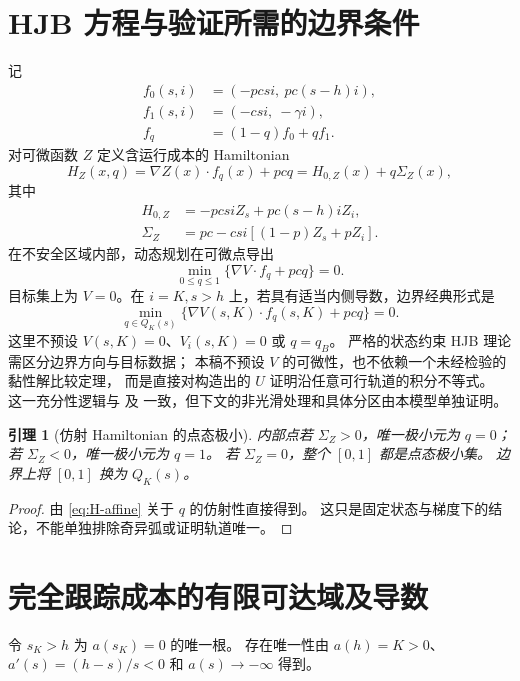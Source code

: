 \documentclass[11pt,a4paper,UTF8]{ctexart}
\newtheorem{lemma}[theorem]{引理}
\theoremstyle{definition}
\begin{document}
\section{HJB 方程与验证所需的边界条件}
\label{sec:HJB}
记
\begin{align}
f_0(s,i)&=(-pcsi,\ pc(s-h)i),\label{eq:f0}\\
f_1(s,i)&=(-csi,\ -\gamma i),\label{eq:f1}\\
f_q&=(1-q)f_0+qf_1.\label{eq:control-affine}
\end{align}
对可微函数 $Z$ 定义含运行成本的 Hamiltonian
\begin{equation}
H_Z(x,q)=\nabla Z(x)\cdot f_q(x)+pcq
=H_{0,Z}(x)+q\Sigma_Z(x),
\label{eq:H-affine}
\end{equation}
其中
\begin{align}
H_{0,Z}&=-pcsiZ_s+pc(s-h)iZ_i,\label{eq:H0}\\
\Sigma_Z&=pc-csi[(1-p)Z_s+pZ_i].\label{eq:switching-function}
\end{align}
在不安全区域内部，动态规划在可微点导出
\begin{equation}
\min_{0\le q\le1}\{\nabla V\cdot f_q+pcq\}=0.
\label{eq:HJB}
\end{equation}
目标集上为 $V=0$。在 $i=K,s>h$ 上，若具有适当内侧导数，边界经典形式是
\begin{equation}
\min_{q\in Q_K(s)}\{\nabla V(s,K)\cdot f_q(s,K)+pcq\}=0.
\label{eq:boundary-HJB}
\end{equation}
这里不预设 $V(s,K)=0$、$V_i(s,K)=0$ 或 $q=q_B$。
严格的状态约束 HJB 理论需区分边界方向与目标数据；
本稿不预设 $V$ 的可微性，也不依赖一个未经检验的黏性解比较定理，
而是直接对构造出的 $U$ 证明沿任意可行轨道的积分不等式。
这一充分性逻辑与 \citet[附录 A.1]{MicloSpiroWeibull2022} 及
\citet[\S5.1.4]{Liberzon2012} 一致，但下文的非光滑处理和具体分区由本模型单独证明。

\begin{lemma}[仿射 Hamiltonian 的点态极小]
\label{lem:bangbang}
内部点若 $\Sigma_Z>0$，唯一极小元为 $q=0$；若 $\Sigma_Z<0$，唯一极小元为 $q=1$。
若 $\Sigma_Z=0$，整个 $[0,1]$ 都是点态极小集。
边界上将 $[0,1]$ 换为 $Q_K(s)$。
\end{lemma}
\begin{proof}
由 \eqref{eq:H-affine} 关于 $q$ 的仿射性直接得到。
这只是固定状态与梯度下的结论，不能单独排除奇异弧或证明轨道唯一。
\end{proof}

\section{完全跟踪成本的有限可达域及导数}
\label{sec:q1-value}
令 $s_K>h$ 为 $a(s_K)=0$ 的唯一根。
存在唯一性由 $a(h)=K>0$、$a'(s)=(h-s)/s<0$ 和 $a(s)\to-\infty$ 得到。
\end{document}
